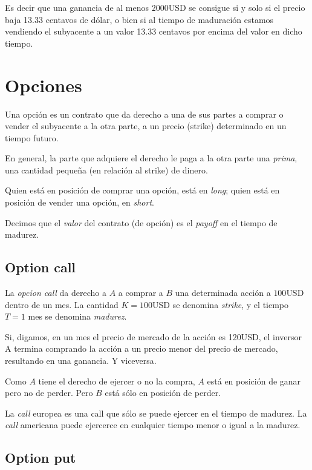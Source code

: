 \documentclass[a4paper, 12pt]{article}
\theoremstyle{definition}
\begin{document}
Es decir que una ganancia de al menos 2000USD se consigue si y solo si el precio
baja 13.33 centavos de dólar, o bien si al tiempo de maduración estamos vendiendo
el subyacente a un valor 13.33 centavos por encima del valor en dicho tiempo.

\pagebreak 

\section{Opciones}

Una opción es un contrato que da derecho a una de sus partes a comprar o vender
el subyacente a la otra parte, a un precio (strike) determinado en un tiempo futuro. 

En general, la parte que adquiere el derecho le paga a la otra parte una
\textit{prima}, una cantidad pequeña (en relación al strike) de dinero.

Quien está en posición de comprar una opción, está en \textit{long}; quien está
en posición de vender una opción, en \textit{short}.

Decimos que el \textit{valor} del contrato (de opción) es el \textit{payoff} en
el tiempo de madurez.

\subsection{Option call}

La \textit{opcion call} da derecho a $A$ a comprar a $B$ una
determinada acción a $100$USD dentro de un mes. La cantidad $K = 100$USD se
denomina \textit{strike}, y el tiempo $T = 1$ mes se denomina \textit{madurez}.

Si, digamos, en un mes el precio de mercado de la acción es 120USD, el inversor
A termina comprando la acción a un precio menor del precio de mercado,
resultando en una ganancia. Y viceversa.

Como $A$ tiene el derecho de ejercer o no la compra, $A$ está en posición de
ganar pero no de perder. Pero $B$ está sólo en posición de perder.

La \textit{call} europea es una call que sólo se puede ejercer en el tiempo de
madurez. La \textit{call} americana puede ejercerce en cualquier tiempo menor o
igual a la madurez.

\subsection{Option put}
\end{document}
